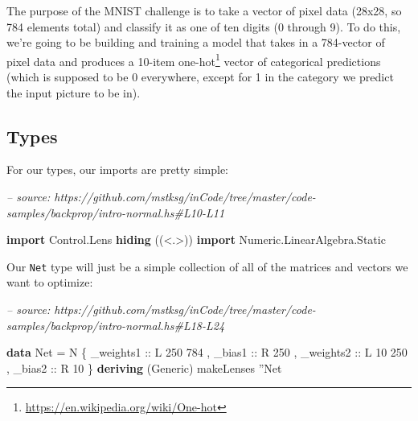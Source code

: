 \documentclass[]{article}
\newenvironment{Shaded}{}{}
\newcommand{\CharTok}[1]{\textcolor[rgb]{0.25,0.44,0.63}{#1}}
\newcommand{\CommentTok}[1]{\textcolor[rgb]{0.38,0.63,0.69}{\textit{#1}}}
\newcommand{\DataTypeTok}[1]{\textcolor[rgb]{0.56,0.13,0.00}{#1}}
\newcommand{\DecValTok}[1]{\textcolor[rgb]{0.25,0.63,0.44}{#1}}
\newcommand{\FunctionTok}[1]{\textcolor[rgb]{0.02,0.16,0.49}{#1}}
\newcommand{\KeywordTok}[1]{\textcolor[rgb]{0.00,0.44,0.13}{\textbf{#1}}}
\newcommand{\NormalTok}[1]{#1}
\newcommand{\OtherTok}[1]{\textcolor[rgb]{0.00,0.44,0.13}{#1}}
\renewcommand{\href}[2]{#2\footnote{\url{#1}}}
\begin{document}
The purpose of the MNIST challenge is to take a vector of pixel data (28x28, so
784 elements total) and classify it as one of ten digits (0 through 9). To do
this, we're going to be building and training a model that takes in a 784-vector
of pixel data and produces a 10-item
\href{https://en.wikipedia.org/wiki/One-hot}{one-hot} vector of categorical
predictions (which is supposed to be 0 everywhere, except for 1 in the category
we predict the input picture to be in).

\hypertarget{types}{%
\subsection{Types}\label{types}}

For our types, our imports are pretty simple:

\begin{Shaded}
\begin{Highlighting}[]
\CommentTok{-- source: https://github.com/mstksg/inCode/tree/master/code-samples/backprop/intro-normal.hs#L10-L11}

\KeywordTok{import}           \DataTypeTok{Control.Lens} \KeywordTok{hiding}\NormalTok{          ((<.>))}
\KeywordTok{import}           \DataTypeTok{Numeric.LinearAlgebra.Static}
\end{Highlighting}
\end{Shaded}

Our \texttt{Net} type will just be a simple collection of all of the matrices
and vectors we want to optimize:

\begin{Shaded}
\begin{Highlighting}[]
\CommentTok{-- source: https://github.com/mstksg/inCode/tree/master/code-samples/backprop/intro-normal.hs#L18-L24}

\KeywordTok{data} \DataTypeTok{Net} \FunctionTok{=} \DataTypeTok{N}\NormalTok{ \{}\OtherTok{ _weights1 ::} \DataTypeTok{L} \DecValTok{250} \DecValTok{784}
\NormalTok{             ,}\OtherTok{ _bias1    ::} \DataTypeTok{R} \DecValTok{250}
\NormalTok{             ,}\OtherTok{ _weights2 ::} \DataTypeTok{L} \DecValTok{10} \DecValTok{250}
\NormalTok{             ,}\OtherTok{ _bias2    ::} \DataTypeTok{R} \DecValTok{10}
\NormalTok{             \}}
  \KeywordTok{deriving}\NormalTok{ (}\DataTypeTok{Generic}\NormalTok{)}
\NormalTok{makeLenses }\CharTok{''}\DataTypeTok{Net}
\end{Highlighting}
\end{Shaded}
\end{document}

